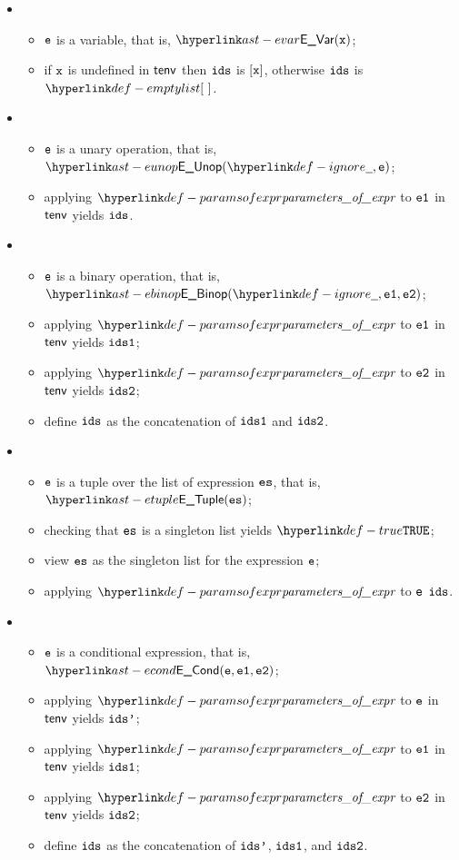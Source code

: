 \ProseParagraph
\OneApplies
\begin{itemize}
  \item {}
    \begin{itemize}
      \item $\texttt{e}$ is a variable, that is, $\EVar(\vx)$;
      \item if $\texttt{x}$ is undefined in $\textsf{tenv}$ then $\texttt{ids}$ is $[\texttt{x}]$, otherwise $\texttt{ids}$ is $\emptylist$.
    \end{itemize}

  \item {}
    \begin{itemize}
      \item $\texttt{e}$ is a unary operation, that is, $\EUnop(\Ignore, \ve)$;
      \item applying $\paramsofexpr$ to $\texttt{e1}$ in $\textsf{tenv}$ yields $\texttt{ids}$\ProseOrTypeError.
    \end{itemize}

  \item {}
    \begin{itemize}
      \item $\texttt{e}$ is a binary operation, that is, $\EBinop(\Ignore, \veone, \vetwo)$;
      \item applying $\paramsofexpr$ to $\texttt{e1}$ in $\textsf{tenv}$ yields $\texttt{ids1}$\ProseOrTypeError;
      \item applying $\paramsofexpr$ to $\texttt{e2}$ in $\textsf{tenv}$ yields $\texttt{ids2}$\ProseOrTypeError;
      \item define $\texttt{ids}$ as the concatenation of $\texttt{ids1}$ and $\texttt{ids2}$.
    \end{itemize}

  \item {}
    \begin{itemize}
      \item $\texttt{e}$ is a tuple over the list of expression $\texttt{es}$, that is, $\ETuple(\es)$;
      \item checking that $\texttt{es}$ is a singleton list yields $\True$\ProseTerminateAs{\BadSubprogramDeclaration};
      \item view $\texttt{es}$ as the singleton list for the expression $\texttt{e}$;
      \item applying $\paramsofexpr$ to $\texttt{e}$ $\texttt{ids}$\ProseOrTypeError.
    \end{itemize}

  \item {}
    \begin{itemize}
      \item $\texttt{e}$ is a conditional expression, that is, $\ECond(\ve, \veone, \vetwo)$;
      \item applying $\paramsofexpr$ to $\texttt{e}$ in $\textsf{tenv}$ yields $\texttt{ids'}$\ProseOrTypeError;
      \item applying $\paramsofexpr$ to $\texttt{e1}$ in $\textsf{tenv}$ yields $\texttt{ids1}$\ProseOrTypeError;
      \item applying $\paramsofexpr$ to $\texttt{e2}$ in $\textsf{tenv}$ yields $\texttt{ids2}$\ProseOrTypeError;
      \item define $\texttt{ids}$ as the concatenation of $\texttt{ids'}$, $\texttt{ids1}$, and $\texttt{ids2}$.
    \end{itemize}


\end{itemize}
